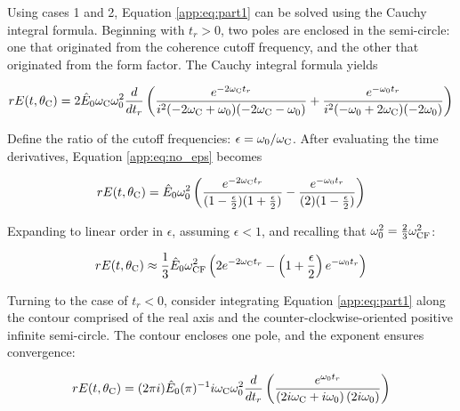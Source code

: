 \documentclass[amsmath,amssymb,aps,prd,10pt,twocolumn]{revtex4}
\begin{document}
Using cases 1 and 2, Equation \ref{app:eq:part1} can be solved using the Cauchy integral formula.  Beginning with $t_r > 0$, two poles are enclosed in the semi-circle: one that originated from the coherence cutoff frequency, and the other that originated from the form factor.  The Cauchy integral formula yields

\begin{widetext}
\begin{equation}
r E(t,\theta_{\rm C}) = 2 \hat{E}_0 \omega_{\rm C} \omega_{\rm 0}^2 \frac{d}{dt_r} \left( \frac{e^{-2\omega_{\rm C} t_r} }{i^2(-2\omega_{\rm C} + \omega_{\rm 0})(-2\omega_{\rm C}-\omega_{\rm 0})} + \frac{e^{-\omega_{\rm 0}t_r}}{i^2(-\omega_{\rm 0} + 2\omega_{\rm C})(-2\omega_{\rm 0})} \right) \label{app:eq:no_eps}
\end{equation}
\end{widetext}

Define the ratio of the cutoff frequencies: $\epsilon = \omega_{\rm 0}/\omega_{\rm C}$.  After evaluating the time derivatives, Equation \ref{app:eq:no_eps} becomes

\begin{equation}
r E(t,\theta_{\rm C}) = \hat{E}_0 \omega_{\rm 0}^2 \left( \frac{ e^{-2\omega_{\rm C} t_r} }{(1 -\frac{\epsilon}{2})(1+\frac{\epsilon}{2})} - \frac{e^{-\omega_{\rm 0}t_r}}{(2)(1-\frac{\epsilon}{2})} \right) \label{app:eq:yes_eps}
\end{equation}

Expanding to linear order in $\epsilon$, assuming $\epsilon < 1$, and recalling that $\omega_{\rm 0}^2 = \frac{2}{3}\omega_{\rm CF}^2$:

\begin{equation}
r E(t,\theta_{\rm C}) \approx \frac{1}{3} \hat{E}_0 \omega_{\rm CF}^2 \left( 2 e^{-2\omega_{\rm C} t_r} - \left(1+\frac{\epsilon}{2} \right) e^{-\omega_{\rm 0}t_r} \right)
\end{equation}

Turning to the case of $t_r < 0$, consider integrating Equation \ref{app:eq:part1} along the contour comprised of the real axis and the counter-clockwise-oriented positive infinite semi-circle.  The contour encloses one pole, and the exponent ensures convergence:

\begin{equation}
r E(t,\theta_{\rm C}) = (2\pi i)\hat{E}_0 (\pi)^{-1} i \omega_{\rm C} \omega_{\rm 0}^2 \frac{d}{dt_r}\left( \frac{ e^{\omega_{\rm 0} t_r}}{ \left(2 i \omega_{\rm C} + i\omega_{\rm 0} \right) (2i\omega_{\rm 0}) } \right)
\end{equation}
\end{document}
